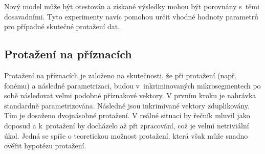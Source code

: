 \noindent Nový model může být otestován a získané výsledky mohou být porovnány s~těmi dosavadními.
Tyto experimenty navíc pomohou určit vhodné hodnoty parametrů pro případné skutečné protažení dat.

\subsection{Protažení na příznacích}
\label{chap:realisation:augmentation:features}

Protažení na příznacích je založeno na skutečnosti, že při protažení (např. fonému) a následné parametrizaci, budou v~inkriminovaných mikrosegmentech po sobě následovat velmi podobné příznakové vektory.
V prvním kroku je nahrávka standardně parametrizována.
Následně jsou inkrimivané vektory zduplikovány. Tím je dosaženo dvojnásobné protažení.
V reálné situaci by řečník mluvil jako doposud a k~protažení by docházelo až při zpracování, což je velmi netriviální úkol.
Jedná se spíše o teoretickou možnost protažení, která však může snadno ověřit hypotézu protažení.

